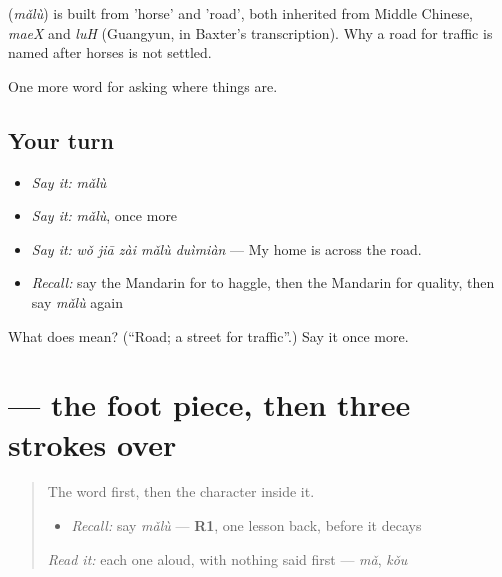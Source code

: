 \begin{cousinweb}
\textbf{} (\emph{mǎlù}) is built from  'horse' and  'road', both inherited from Middle Chinese, \emph{maeX} and \emph{luH} (Guangyun, in Baxter's transcription). Why a road for traffic is named after horses is not settled.
\end{cousinweb}

\begin{grammarlens}[title={What you've built}]
One more word for asking where things are.
\end{grammarlens}

\subsection*{Your turn}
\begin{itemize}
\raggedright
  \item \emph{Say it:} \emph{mǎlù}
  \item \emph{Say it:} \emph{mǎlù}, once more
  \item \emph{Say it:} \emph{wǒ jiā zài mǎlù duìmiàn} — My home is across the road.
  \item \emph{Recall:} say the Mandarin for to haggle, then the Mandarin for quality, then say \emph{mǎlù} again
\end{itemize}

\begin{tcolorbox}[breakable,colback=teal!4,colframe=teal!35!black,title={Before you move on}]
What does  mean? (\textquotedblleft{}Road; a street for traffic\textquotedblright{}.) Say it once more.
\end{tcolorbox}
\section[\texorpdfstring{\zh{路} (lù)}{路 (lù)}]{ — the foot piece, then three strokes over }

\label{lesson:ZH-W194-lu-road}



\begin{quote}
The word first, then the character inside it.

\begin{itemize}
\raggedright
  \item \emph{Recall:} say \emph{mǎlù} — \textbf{R1}, one lesson back, before it decays
\end{itemize}

\begin{quote}
 
\end{quote}

\emph{Read it:} each one aloud, with nothing said first — \emph{mǎ}, \emph{kǒu}
\end{quote}

